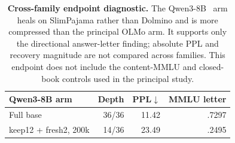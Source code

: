 \begin{table}[t]
\centering
\small
\setlength{\tabcolsep}{5pt}
\begin{tabular}{@{}lrrr@{}}
\toprule
\textbf{Qwen3-8B arm} & \textbf{Depth} & \textbf{PPL}$\downarrow$ & \textbf{MMLU letter} \\
\midrule
Full base & 36/36 & 11.42 & .7297 \\
keep12 + fresh2, 200k & 14/36 & 23.49 & .2495 \\
\bottomrule
\end{tabular}
\caption{\textbf{Cross-family endpoint diagnostic.} The Qwen3-8B~\citep{qwen3} arm heals on
SlimPajama rather than Dolmino and is more compressed than the principal OLMo
arm. It supports only the directional answer-letter finding; absolute PPL and
recovery magnitude are not compared across families. This endpoint does not
include the content-MMLU and closed-book controls used in the principal study.}
\label{tab:app-crossfamily}
\end{table}
